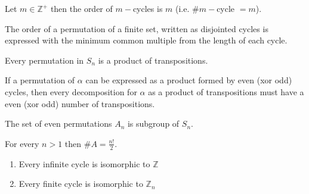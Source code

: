 \begin{assignment}[
  header=HeaderA,
  body=BodyA,
  title={Proved Theorems in  Group Theory},
  duedate={\today},
  toc=false,
  toctitle={This appears on the Table of contents.},
  exlist=false
]
\begin{mtheorem}[16][][thm:16]
Let $m \in \mathbb{Z}^+$ then the order of $m-$cycles is $m$ (i.e. $\#m-$cycle $= m$).
\end{mtheorem}

\begin{mtheorem}[17][][thm:17]
The order of a permutation of a finite set, written as disjointed cycles is expressed with the minimum common multiple from the length of each cycle.
\end{mtheorem}

\begin{mtheorem}[18][][thm:18]
Every permutation in $S_n$ is a product of transpositions.
\end{mtheorem}

\begin{mtheorem}[20][][thm:20]
If a permutation of $\alpha$ can be expressed as a product formed by even (xor odd) cycles, then every decomposition for $\alpha$ as a product of transpositions must have a even (xor odd) number of transpositions.
\end{mtheorem}

\begin{mtheorem}[21][][thm:21]
The set of even permutations $A_n$ is subgroup of $S_n$.
\end{mtheorem}

\begin{mtheorem}[22][][thm:22]
For every $n > 1$ then $\#A = \frac{n!}{2}$.
\end{mtheorem}

\begin{mtheorem}[23][][thm:23]
\begin{enumerate}
    \item[a)] Every infinite cycle is isomorphic to $\mathbb{Z}$
    \item[b)] Every finite cycle is isomorphic to $\mathbb{Z}_n$
\end{enumerate}
\end{mtheorem}


\end{assignment}
